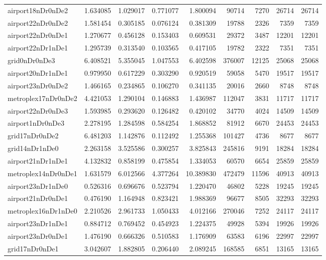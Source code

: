 \begin{longtable}{|l|r|r|r|r|r|r|r|r|}
airport18nDr0nDe2 & 1.634085 & 1.029017 & 0.771077 & 1.800094 & 90714 & 7270 & 26714 & 26714 \\
airport22nDr0nDe2 & 1.581454 & 0.305185 & 0.076124 & 0.381309 & 19788 & 2326 & 7359 & 7359 \\
airport22nDr0nDe1 & 1.270677 & 0.456128 & 0.153403 & 0.609531 & 29372 & 3487 & 12201 & 12201 \\
airport22nDr1nDe1 & 1.295739 & 0.313540 & 0.103565 & 0.417105 & 19782 & 2322 & 7351 & 7351 \\
grid0nDr0nDe3 & 6.408521 & 5.355045 & 1.047553 & 6.402598 & 376007 & 12125 & 25068 & 25068 \\
airport20nDr1nDe1 & 0.979950 & 0.617229 & 0.303290 & 0.920519 & 59058 & 5470 & 19517 & 19517 \\
airport23nDr0nDe2 & 1.466165 & 0.234865 & 0.106270 & 0.341135 & 20016 & 2660 & 8748 & 8748 \\
metroplex17nDr0nDe2 & 4.421053 & 1.290104 & 0.146883 & 1.436987 & 112047 & 3831 & 11717 & 11717 \\
airport22nDr0nDe3 & 1.593985 & 0.293620 & 0.126482 & 0.420102 & 34770 & 4024 & 14509 & 14509 \\
airport1nDr0nDe3 & 2.278195 & 1.284598 & 0.584254 & 1.868852 & 81912 & 6670 & 24453 & 24453 \\
grid17nDr0nDe2 & 6.481203 & 1.142876 & 0.112492 & 1.255368 & 101427 & 4736 & 8677 & 8677 \\
grid14nDr1nDe0 & 2.263158 & 3.525586 & 0.300257 & 3.825843 & 245816 & 9191 & 18284 & 18284 \\
airport21nDr1nDe1 & 4.132832 & 0.858199 & 0.475854 & 1.334053 & 60570 & 6654 & 25859 & 25859 \\
metroplex14nDr0nDe1 & 1.631579 & 6.012566 & 4.377264 & 10.389830 & 472479 & 11596 & 40913 & 40913 \\
airport23nDr1nDe0 & 0.526316 & 0.696676 & 0.523794 & 1.220470 & 46802 & 5228 & 19245 & 19245 \\
airport21nDr0nDe1 & 0.476190 & 1.164948 & 0.823421 & 1.988369 & 96677 & 8505 & 32293 & 32293 \\
metroplex16nDr1nDe0 & 2.210526 & 2.961733 & 1.050433 & 4.012166 & 270046 & 7252 & 24117 & 24117 \\
airport23nDr1nDe1 & 0.884712 & 0.769452 & 0.454923 & 1.224375 & 49928 & 5394 & 19926 & 19926 \\
airport23nDr0nDe1 & 1.476190 & 0.666326 & 0.510583 & 1.176909 & 63583 & 6196 & 22997 & 22997 \\
grid17nDr0nDe1 & 3.042607 & 1.882805 & 0.206440 & 2.089245 & 168585 & 6851 & 13165 & 13165 \\

\end{longtable}
